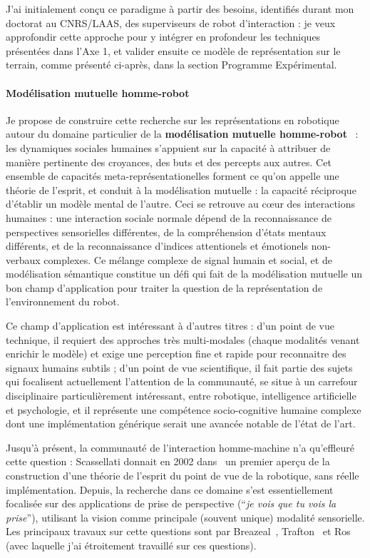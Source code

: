 \documentclass[a4paper]{article}
\begin{document}
J'ai initialement conçu ce paradigme à partir des besoins, identifiés durant
mon doctorat au CNRS/LAAS, des superviseurs de robot d'interaction : je veux
approfondir cette approche pour y intégrer en profondeur les techniques
présentées dans l'Axe 1, et valider ensuite ce modèle de représentation sur le
terrain, comme présenté ci-après, dans la section Programme Expérimental.

\paragraph{Modélisation mutuelle homme-robot}


Je propose de construire cette recherche sur les représentations en robotique
autour du domaine particulier de la \textbf{modélisation mutuelle
homme-robot}~\cite{lemaignan2015mutual} :
les dynamiques sociales humaines s'appuient sur la capacité à attribuer de
manière pertinente des croyances, des buts et des percepts aux autres. Cet
ensemble de capacités meta-représentationelles forment ce qu'on appelle une
théorie de l'esprit, et conduit à la modélisation mutuelle : la capacité
réciproque d'établir un modèle mental de l'autre. Ceci se retrouve au c\oe ur
des interactions humaines : une interaction sociale normale dépend de la
reconnaissance de perspectives sensorielles différentes, de la compréhension
d'états mentaux différents, et de la reconnaissance d'indices attentionels et
émotionels non-verbaux complexes.  Ce mélange complexe de signal humain et
social, et de modélisation sémantique constitue un défi qui fait de la
modélisation mutuelle un bon champ d'application pour traiter la question de la
représentation de l'environnement du robot.

Ce champ d'application est intéressant à d'autres titres : d'un point de vue
technique, il requiert des approches très multi-modales (chaque modalités venant
enrichir le modèle) et exige une perception fine et rapide pour reconnaitre des
signaux humains subtils ; d'un point de vue scientifique, il fait partie des
sujets qui focalisent actuellement l'attention de la communauté, se situe à un
carrefour disciplinaire particulièrement intéressant, entre robotique,
intelligence artificielle et psychologie, et il représente une compétence
socio-cognitive humaine complexe dont une implémentation générique serait une
avancée notable de l'état de l'art.

Jusqu'à présent, la communauté de l'interaction homme-machine n'a qu'effleuré
cette question : Scassellati donnait en 2002 dans~\cite{scassellati2002theory}
un premier aperçu de la construction d'une théorie de l'esprit du point de vue
de la robotique, sans réelle implémentation. Depuis, la recherche dans ce
domaine s'est essentiellement focalisée sur des applications de prise de
perspective (``\emph{je vois que tu vois la prise}''), utilisant la vision comme
principale (souvent unique) modalité sensorielle. Les principaux travaux sur
cette questions sont par Breazeal~\cite{breazeal2006using},
Trafton~\cite{Trafton2005} et Ros~\cite{Ros2010} (avec laquelle j'ai étroitement
travaillé sur ces questions).
\end{document}
